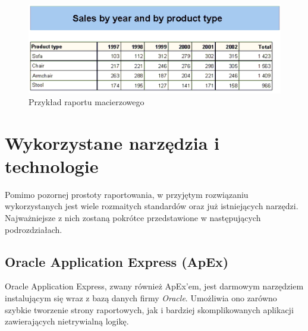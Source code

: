 \documentclass[11pt,a4paper]{article}
\begin{document}
\begin{figure}[h]
\centering
\includegraphics[scale=1]{crosstab_report}
\caption{Przykład raportu macierzowego}
\label{img:ct}
\end{figure}

\newpage

\section{Wykorzystane narzędzia i technologie} \label{sec:tools}
Pomimo pozornej prostoty raportowania, w przyjętym rozwiązaniu wykorzystanych jest wiele rozmaitych standardów oraz już istniejących narzędzi. Najważniejsze z nich zostaną pokrótce przedstawione w następujących podrozdziałach.

\subsection{Oracle Application Express (ApEx)} \label{tools:apex}
Oracle Application Express, zwany również ApEx'em, jest darmowym narzędziem instalującym się wraz z bazą danych firmy \emph{Oracle}. Umożliwia ono zarówno szybkie tworzenie strony raportowych, jak i bardziej skomplikowanych aplikacji zawierających nietrywialną logikę.
\end{document}
